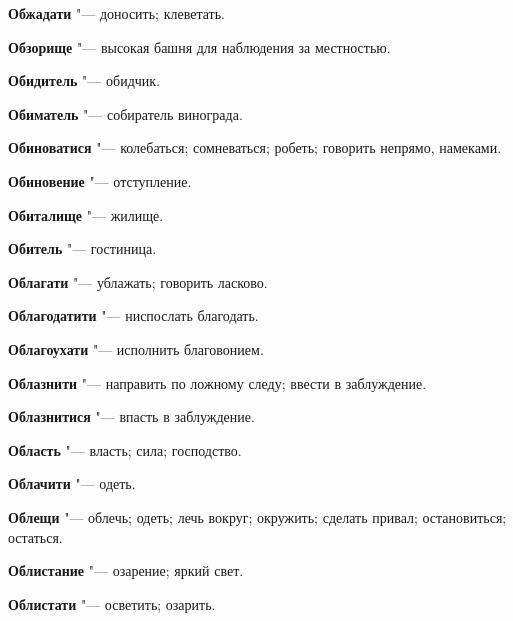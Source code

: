 \begin{mymulticols}{2}
\noindent\textbf{Обжадати} "--- доносить; клеветать. 




\noindent\textbf{Обзорище} "--- высокая башня для наблюдения за местностью. 




\noindent\textbf{Обидитель} "--- обидчик. 




\noindent\textbf{Обиматель} "--- собиратель винограда. 




\noindent\textbf{Обиноватися} "--- колебаться; сомневаться; робеть; говорить непрямо, намеками. 




\noindent\textbf{Обиновение} "--- отступление. 




\noindent\textbf{Обиталище} "--- жилище. 




\noindent\textbf{Обитель} "--- гостиница. 




\noindent\textbf{Облагати} "--- ублажать; говорить ласково. 




\noindent\textbf{Облагодатити} "--- ниспослать благодать. 




\noindent\textbf{Облагоухати} "--- исполнить благовонием. 




\noindent\textbf{Облазнити} "--- направить по ложному следу; ввести в заблуждение. 




\noindent\textbf{Облазнитися} "--- впасть в заблуждение. 




\noindent\textbf{Область} "--- власть; сила; господство. 




\noindent\textbf{Облачити} "--- одеть. 




\noindent\textbf{Облещи} "--- облечь; одеть; лечь вокруг; окружить; сделать привал; остановиться; остаться. 




\noindent\textbf{Облистание} "--- озарение; яркий свет. 




\noindent\textbf{Облистати} "--- осветить; озарить. 





\end{mymulticols}
